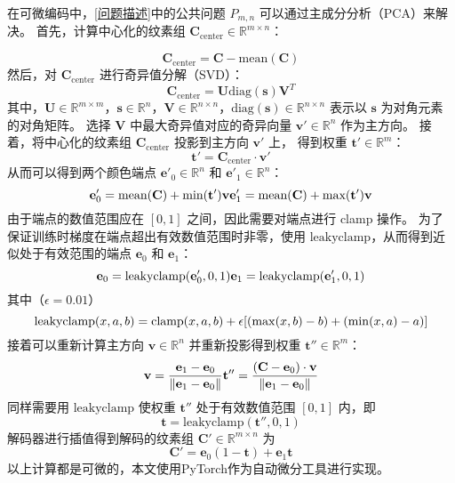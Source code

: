 在可微编码中，\ref{问题描述}中的公共问题 $P_{m,n}$ 可以通过主成分分析（PCA）来解决。
首先，计算中心化的纹素组 $\mathbf{C}_{\text{center}}\in\mathbb{R}^{m\times n}$：

\begin{equation}
\mathbf{C}_{\text{center}}=\mathbf{C}-\text{mean}(\mathbf{C})
\end{equation}
然后，对 $\mathbf{C}_{\text{center}}$ 进行奇异值分解（SVD）：
\begin{equation}
\mathbf{C}_{\text{center}}=\mathbf{U}\text{diag}(\mathbf{s})\mathbf{V}^T
\end{equation}
其中，$\mathbf{U}\in \mathbb{R}^{m \times m}$，$\mathbf{s}\in \mathbb{R}^{n}$，$\mathbf{V}\in \mathbb{R}^{n\times n}$，$\text{diag}(\mathbf{s})\in\mathbb{R}^{n\times n}$ 表示以 $\mathbf{s}$ 为对角元素的对角矩阵。
选择 $\mathbf{V}$ 中最大奇异值对应的奇异向量 $\mathbf{v}'\in \mathbb{R}^{n}$ 作为主方向。
接着，将中心化的纹素组 $\mathbf{C}_\text{center}$ 投影到主方向 $\mathbf{v}'$ 上，
得到权重 $\mathbf{t}'\in\mathbb{R}^{m}$：
\begin{equation}
\mathbf{t}'=\mathbf{C}_{\text{center}}\cdot\mathbf{v}'
\end{equation}
从而可以得到两个颜色端点 $\mathbf{e}'_0\in\mathbb{R}^n$ 和 $\mathbf{e}'_1\in\mathbb{R}^n$：
\begin{equation}
\mathbf{e}'_0=\text{mean}(\mathbf{C})+\text{min}(\mathbf{t}')\mathbf{v}\\
\mathbf{e}'_1=\text{mean}(\mathbf{C})+\text{max}(\mathbf{t}')\mathbf{v}
\end{equation}
由于端点的数值范围应在 $[0,1]$ 之间，因此需要对端点进行 clamp 操作。
为了保证训练时梯度在端点超出有效数值范围时非零，使用 $\text{leakyclamp}$，从而得到近似处于有效范围的端点 $\mathbf{e}_0$ 和 $\mathbf{e}_1$：
\begin{equation}
\mathbf{e}_0=\text{leakyclamp}(\mathbf{e}'_0,0,1)\\
\mathbf{e}_1=\text{leakyclamp}(\mathbf{e}'_1,0,1)
\end{equation}
其中（$\epsilon=0.01$）
\begin{equation}
\text{leakyclamp}(x,a,b)=\text{clamp}(x,a,b)\\
                        +\epsilon[(\max(x,b)-b)+(\min(x,a)-a)]
\end{equation}
接着可以重新计算主方向 $\mathbf{v}\in\mathbb{R}^n$ 并重新投影得到权重 $\mathbf{t}''\in\mathbb{R}^m$：
\begin{equation}
\mathbf{v}=\frac{\mathbf{e}_1-\mathbf{e}_0}{\|\mathbf{e}_1-\mathbf{e}_0\|}\\
\mathbf{t}''=\frac{(\mathbf{C}-\mathbf{e}_0)\cdot\mathbf{v}}{\|\mathbf{e}_1-\mathbf{e}_0\|}
\end{equation}
同样需要用 $\text{leakyclamp}$ 使权重 $\mathbf{t}''$ 处于有效数值范围 $[0,1]$ 内，即
\begin{equation}
\mathbf{t}=\text{leakyclamp}(\mathbf{t}'',0,1)
\end{equation}
解码器进行插值得到解码的纹素组 $\mathbf{C}'\in\mathbb{R}^{m\times n}$ 为
\begin{equation}
\mathbf{C}'=\mathbf{e}_0(1-\mathbf{t})+\mathbf{e}_1\mathbf{t}
\end{equation}
以上计算都是可微的，本文使用PyTorch作为自动微分工具进行实现。

